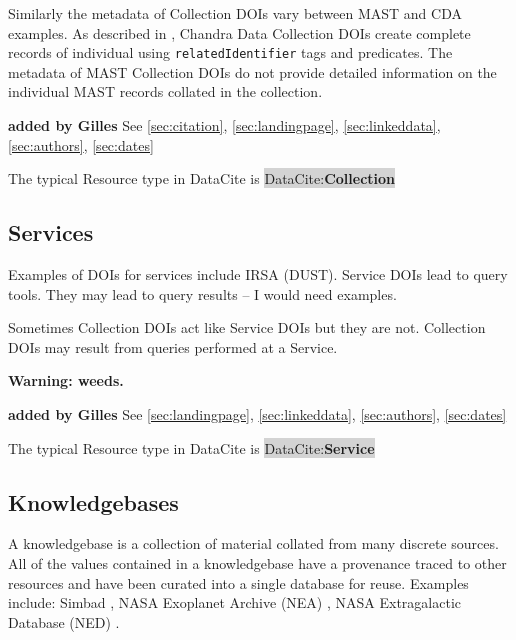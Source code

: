 \documentclass[11pt,a4paper]{ivoa}
\newcommand{\dataciteterm}[1]{\colorbox{lightgray}{DataCite:\textbf{#1}}}
\begin{document}
Similarly the metadata of Collection DOIs vary between MAST and CDA examples. 
As described in \citet{2023ChNew..34....5D}, Chandra Data Collection DOIs create complete records of individual using \texttt{relatedIdentifier} tags and predicates. 
The metadata of MAST Collection DOIs do not provide detailed information on the individual MAST records collated in the collection.


\textbf{\color{red} added by Gilles}
See \ref{sec:citation}, \ref{sec:landingpage}, \ref{sec:linkeddata}, \ref{sec:authors}, \ref{sec:dates}

The typical Resource type in DataCite is \dataciteterm{Collection}

\subsection{Services}
\label{sec:intro:services}

Examples of DOIs for services include IRSA (DUST).
Service DOIs lead to query tools.
They may lead to query results -- I would need examples.

Sometimes Collection DOIs act like Service DOIs but they are not.
Collection DOIs may result from queries performed at a Service.

\textbf{Warning: weeds.}


\textbf{\color{red} added by Gilles}
See \ref{sec:landingpage}, \ref{sec:linkeddata}, \ref{sec:authors}, \ref{sec:dates}


The typical Resource type in DataCite is \dataciteterm{Service}

\subsection{Knowledgebases}
\label{sec:intro:kdbs}

A knowledgebase is a collection of material collated from many discrete sources.
All of the values contained in a knowledgebase have a provenance traced to other resources and have been curated into a single database for reuse.
Examples include: Simbad \citep[as originally described in, ][]{2000A&AS..143....9W}, NASA Exoplanet Archive (NEA) \citep{NEA12-doi2bib} \citep[as originally described in,][]{2013PASP..125..989A}, NASA Extragalactic Database (NED) \citep{NED1-doi2bib} \citep[as originally described in,][]{1991ASSL..171...89H}. 
\end{document}
